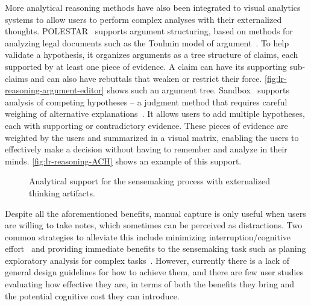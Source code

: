 More analytical reasoning methods have also been integrated to visual analytics systems to allow users to perform complex analyses with their externalized thoughts. POLESTAR~\cite{Pioch2006} supports argument structuring, based on methods for analyzing legal documents such as the Toulmin model of argument~\cite{Toulmin2003}. To help validate a hypothesis, it organizes arguments as a tree structure of claims, each supported by at least one piece of evidence. A claim can have its supporting sub-claims and can also have rebuttals that weaken or restrict their force. \autoref{fig:lr-reasoning-argument-editor} shows such an argument tree. Sandbox~\cite{Wright2006} supports analysis of competing hypotheses -- a judgment method that requires careful weighing of alternative explanations~\cite{Heuer1999}. It allows users to add multiple hypotheses, each with supporting or contradictory evidence. These pieces of evidence are weighted by the users and summarized in a visual matrix, enabling the users to effectively make a decision without having to remember and analyze in their minds. \autoref{fig:lr-reasoning-ACH} shows an example of this support.

\begin{figure}
\centering
{}
\hfill
{}
\caption[Analytical support for the sensemaking process]{Analytical support for the sensemaking process with externalized thinking artifacts.}
\label{fig:lr-reasoning}
\end{figure}

Despite all the aforementioned benefits, manual capture is only useful when users are willing to take notes, which sometimes can be perceived as distractions. Two common strategies to alleviate this include minimizing interruption/cognitive effort~\cite{Hong2008} and providing immediate benefits to the sensemaking task such as planing exploratory analysis for complex tasks~\cite{Lunzer2014}. However, currently there is a lack of general design guidelines for how to achieve them, and there are few user studies evaluating how effective they are, in terms of both the benefits they bring and the potential cognitive cost they can introduce.

